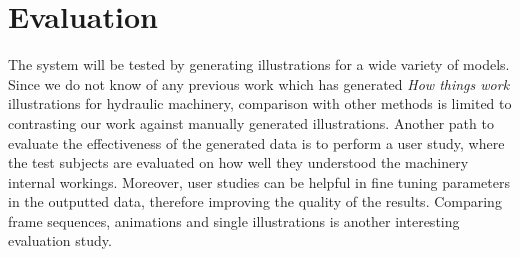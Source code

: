 \chapter{Evaluation}

The system will be tested by generating illustrations for a wide variety of models.
Since we do not know of any previous work which has generated \textit{How things work} illustrations for hydraulic machinery, comparison with other methods is limited to contrasting our work against manually generated illustrations.
Another path to evaluate the effectiveness of the generated data is to perform a user study, where the test subjects are evaluated on how well they understood the machinery internal workings.
Moreover, user studies can be helpful in fine tuning parameters in the outputted data, therefore improving the quality of the results.
Comparing frame sequences, animations and single illustrations is another interesting evaluation study.

